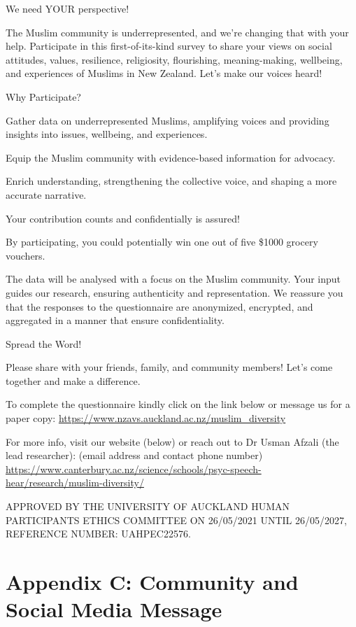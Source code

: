 \documentclass[
]{interact}
\begin{document}
\noindent We need YOUR perspective!

\noindent The Muslim community is underrepresented, and we're changing
that with your help. Participate in this first-of-its-kind survey to
share your views on social attitudes, values, resilience, religiosity,
flourishing, meaning-making, wellbeing, and experiences of Muslims in
New Zealand. Let's make our voices heard!

\noindent Why Participate?

\noindent Gather data on underrepresented Muslims, amplifying voices and
providing insights into issues, wellbeing, and experiences.

\noindent Equip the Muslim community with evidence-based information for
advocacy.

\noindent Enrich understanding, strengthening the collective voice, and
shaping a more accurate narrative.

\noindent Your contribution counts and confidentially is assured!

\noindent By participating, you could potentially win one out of five
\$1000 grocery vouchers.

\noindent The data will be analysed with a focus on the Muslim
community. Your input guides our research, ensuring authenticity and
representation. We reassure you that the responses to the questionnaire
are anonymized, encrypted, and aggregated in a manner that ensure
confidentiality.

\noindent Spread the Word!

\noindent Please share with your friends, family, and community members!
Let's come together and make a difference.

\noindent To complete the questionnaire kindly click on the link below
or message us for a paper copy:
\url{https://www.nzavs.auckland.ac.nz/muslim_diversity}

\noindent For more info, visit our website (below) or reach out to Dr
Usman Afzali (the lead researcher): (email address and contact phone
number)
\url{https://www.canterbury.ac.nz/science/schools/psyc-speech-hear/research/muslim-diversity/}

\noindent APPROVED BY THE UNIVERSITY OF AUCKLAND HUMAN PARTICIPANTS
ETHICS COMMITTEE ON 26/05/2021 UNTIL 26/05/2027, REFERENCE NUMBER:
UAHPEC22576.

\newpage{}

\section{Appendix C: Community and Social Media
Message}\label{appendix-c-community-and-social-media-message}
\end{document}
